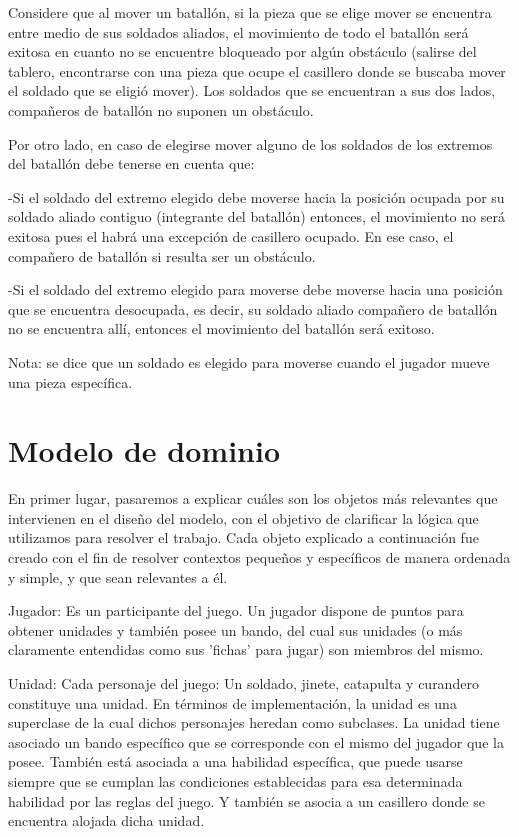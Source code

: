 \documentclass[titlepage,a4paper]{article}
\begin{document}
Considere que al mover un batallón, si la pieza que se elige mover se encuentra entre medio de sus soldados aliados, el movimiento de todo el batallón será exitosa en cuanto no se encuentre bloqueado por algún obstáculo (salirse del tablero, encontrarse con una pieza que ocupe el casillero donde se buscaba mover el soldado que se eligió mover). Los soldados que se encuentran a sus dos lados, compañeros de batallón no suponen un obstáculo. 

Por otro lado, en caso de elegirse mover alguno de los soldados de los extremos del batallón debe tenerse en cuenta que:

-Si el soldado del extremo elegido debe moverse hacia la posición ocupada por su soldado aliado contiguo (integrante del batallón) entonces, el movimiento no será exitosa pues el habrá una excepción de casillero ocupado. En ese caso, el compañero de batallón si resulta ser un obstáculo.

-Si el soldado del extremo elegido para moverse debe moverse hacia una posición que se encuentra desocupada, es decir, su soldado aliado compañero de batallón no se encuentra allí, entonces el movimiento del batallón será exitoso. 

Nota: se dice que un soldado es elegido para moverse cuando el jugador mueve una pieza específica. 




\section{Modelo de dominio}\label{sec:modelo}


En primer lugar, pasaremos a explicar cuáles son los objetos más relevantes que  intervienen en el diseño del modelo, con el objetivo de clarificar la lógica que utilizamos para resolver el trabajo.
Cada objeto explicado a continuación fue creado con el fin de resolver contextos pequeños y específicos de manera ordenada y simple, y que sean relevantes a él. 

Jugador: Es un participante del juego. Un jugador dispone de puntos para obtener unidades y también posee un bando, del cual sus unidades (o más claramente entendidas como sus 'fichas' para jugar) son miembros del mismo. 

Unidad: Cada personaje del juego: Un soldado, jinete, catapulta y curandero constituye una unidad. En términos de implementación, la unidad es una superclase de la cual dichos personajes heredan como subclases. La unidad tiene asociado un bando específico que se corresponde con el mismo del jugador que la posee. También está asociada a una habilidad específica, que puede usarse siempre que se cumplan las condiciones establecidas para esa determinada habilidad por las reglas del juego. Y también se asocia a un casillero donde se encuentra alojada dicha unidad. 
\end{document}
